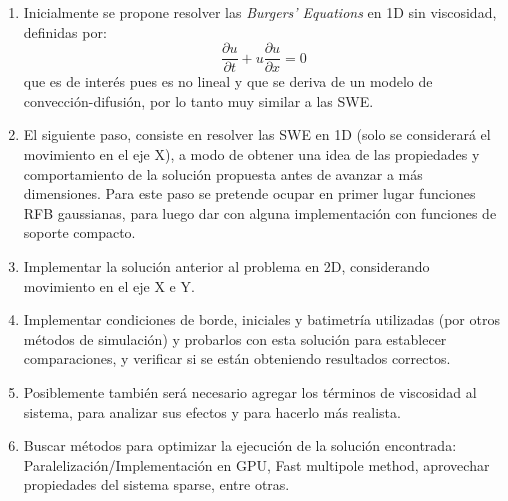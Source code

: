 ﻿\documentclass[spanish, fleqn]{article}
\begin{document}
\begin{enumerate}
\item Inicialmente se propone resolver las \emph{Burgers' Equations} en 1D sin viscosidad, definidas por:
\begin{equation}
\frac{\partial u}{\partial t} + u\frac{\partial u}{\partial x} = 0
\label{eq:burger}
\end{equation}
que es de interés pues es no lineal y que se deriva de un modelo de convección-difusión, por lo tanto muy similar a las SWE.

\item El siguiente paso, consiste en resolver las SWE en 1D (solo se considerará el movimiento en el eje X), a modo de obtener una idea de las propiedades y comportamiento de la solución propuesta antes de avanzar a más dimensiones. Para este paso se pretende ocupar en primer lugar funciones RFB gaussianas, para luego dar con alguna implementación con funciones de soporte compacto.

\item Implementar la solución anterior al problema en 2D, considerando movimiento en el eje X e Y. 

\item Implementar condiciones de borde, iniciales y batimetría utilizadas (por otros métodos de simulación) y probarlos con esta solución para establecer comparaciones, y verificar si se están obteniendo resultados correctos.

\item Posiblemente también será necesario agregar los términos de viscosidad al sistema, para analizar sus efectos y para hacerlo más realista.

\item Buscar métodos para optimizar la ejecución de la solución encontrada: Paralelización/Implementación en GPU, Fast multipole method, aprovechar propiedades del sistema sparse, entre otras.
\end{enumerate}
\end{document}
